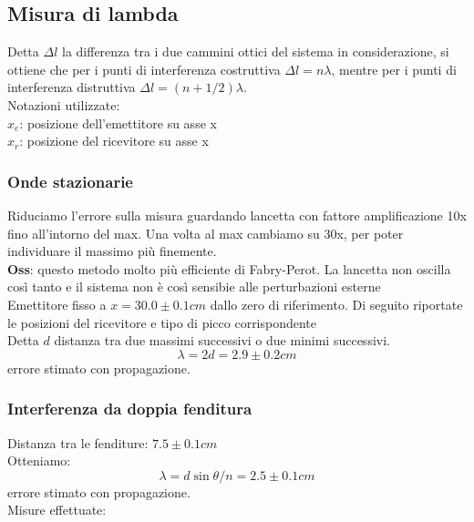 \subsection{Misura di lambda}
%
Detta $\Delta l$ la differenza tra i due cammini ottici del sistema in considerazione, si ottiene che per i punti di interferenza costruttiva 
    $ \Delta l = n \lambda $, 
mentre per i punti di interferenza distruttiva
    $ \Delta l = (n + 1/2) \lambda $.\\
Notazioni utilizzate:\\
    $x_e$: posizione dell'emettitore su asse x\\
    $x_r$: posizione del ricevitore su asse x\\
%
\subsubsection{Onde stazionarie}
    Riduciamo l'errore sulla misura guardando lancetta con fattore amplificazione 10x fino all'intorno del max. Una volta al max cambiamo su 30x, per poter individuare il massimo più finemente.\\
    \textbf{Oss}: questo metodo molto più efficiente di Fabry-Perot. La lancetta non oscilla così tanto e il sistema non è così sensibie alle perturbazioni esterne \\
    Emettitore fisso a $ x = 30.0 \pm 0.1 cm $ dallo zero di riferimento.
    Di seguito riportate le posizioni del ricevitore e tipo di picco corrispondente\\
%
    
%
    Detta $d$ distanza tra due massimi successivi o due minimi successivi.
    $$ \lambda = 2d = 2.9 \pm 0.2 cm $$
    errore stimato con propagazione.\\
%
\subsubsection{Interferenza da doppia fenditura}
    Distanza tra le fenditure: $7.5 \pm 0.1 cm$\\
    Otteniamo:
        $$ \lambda = d\sin\theta/n = 2.5 \pm 0.1 cm$$
    errore stimato con propagazione.\\
    Misure effettuate:
    
%
